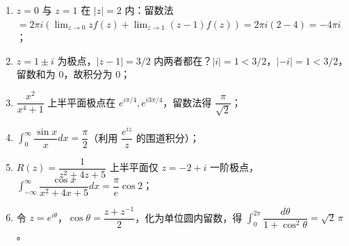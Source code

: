 \begin{enumerate}
\begin{enumerate}
  \item
    \(z=0\) 与 \(z=1\) 在 \(|z|=2\) 内：留数法
    \(=2\pi i\left(\lim_{z\to0}zf(z)+\lim_{z\to1}(z-1)f(z)\right)=2\pi i(2-4)=-4\pi i\)；
  \item
    \(z=1\pm i\) 为极点，\(|z-1|=3/2\)
    内两者都在？\(|i|=1<3/2\)，\(|-i|=1<3/2\)，留数和为 \(0\)，故积分为
    \(0\)；
  \item
    \(\dfrac{x^2}{x^4+1}\) 上半平面极点在
    \(e^{i\pi/4},e^{i3\pi/4}\)，留数法得 \(\dfrac{\pi}{\sqrt2}\)；
  \item
    \(\int_0^\infty\dfrac{\sin x}{x}dx=\dfrac{\pi}{2}\)（利用
    \(\dfrac{e^{iz}}{z}\) 的围道积分）；
  \item
    \(R(z)=\dfrac{1}{z^2+4z+5}\) 上半平面仅 \(z=-2+i\)
    一阶极点，\(\int_{-\infty}^\infty\dfrac{\cos x}{x^2+4x+5}dx=\dfrac{\pi}{e}\cos2\)；
  \item
    令
    \(z=e^{i\theta}\)，\(\cos\theta=\dfrac{z+z^{-1}}{2}\)，化为单位圆内留数，得
    \(\int_0^{2\pi}\dfrac{d\theta}{1+\cos^2\theta}=\sqrt2\,\pi\)。
  \end{enumerate}
\end{enumerate}

